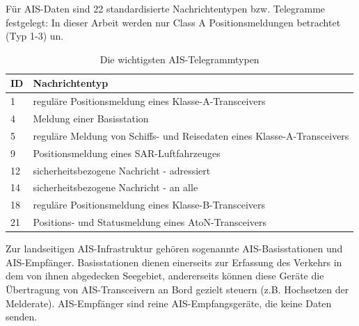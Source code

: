 Für AIS-Daten sind 22 standardisierte Nachrichtentypen bzw. Telegramme festgelegt:
In dieser Arbeit werden nur Class A Positionsmeldungen betrachtet (Typ 1-3) un.
\begin{table}[!hbt]
\centering
\begin{tabular}{|l|l|}\hline
ID&Nachrichtentyp\\\hline\hline
1& reguläre Positionsmeldung eines Klasse-A-Transceivers\\
4 & Meldung einer Basisstation\\
5& reguläre Meldung von Schiffs- und Reisedaten eines Klasse-A-Transceivers\\
9 & Positionsmeldung eines SAR-Luftfahrzeuges\\
12& sicherheitsbezogene Nachricht - adressiert\\
14& sicherheitsbezogene Nachricht - an alle\\
18& reguläre Positionsmeldung eines Klasse-B-Transceivers\\
21& Positions- und Statusmeldung eines AtoN-Transceivers\\\hline
\end{tabular}
\caption[Die wichtigsten AIS-Telegrammtypen] {Die wichtigsten AIS-Telegrammtypen}
\end{table}

Zur landseitigen AIS-Infrastruktur gehören sogenannte AIS-Basisstationen und AIS-Empfänger. Basisstationen dienen einerseits zur Erfassung des Verkehrs in dem von ihnen abgedecken Seegebiet, andererseits können diese Geräte die Übertragung von AIS-Transceivern an Bord gezielt steuern (z.B. Hochsetzen der Melderate). AIS-Empfänger sind reine AIS-Empfangsgeräte, die keine Daten senden.\\


